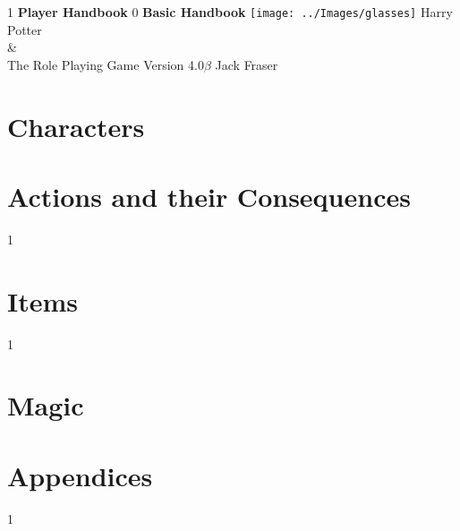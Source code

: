 \documentclass[oneside, twocolumn,9pt,english]{extbook}
\def\coreMode{1}
\newcommand*\cleartoleftpage{%
  \clearpage
  \ifodd\value{page}\hbox{}\clearpage\fi
}
\begin{document}
\begin{titlepage}
    \centering
    \vfill
    \if\coreMode1
    {\bfseries
        {\HP \fontsize{40}{35}\selectfont Player Handbook}
    }    
    \fi
    \if\coreMode0
    {\bfseries
        {\HP \fontsize{40}{35}\selectfont Basic Handbook}
    } 
    \fi
    \vfill
    \texttt{[image: ../Images/glasses]} %
    \vfill
    {\HP \fontsize{30}{24} \selectfont  Harry Potter \\\&\\ The Role Playing Game}
    \normalsize
    \vfill
    {\HP \fontsize{22}{0} \selectfont Version 4.0$\beta$ \hfill Jack Fraser}
\end{titlepage}

\setcounter{tocdepth}{0}  
\begin{spacing}{0.8}
\footnotesize
\tableofcontents
\normalsize
\end{spacing}


\cleartoleftpage
\part{Characters} \label{C:CharacterCreation}


%



\cleartoleftpage
\part{Actions and their Consequences}





\if\coreMode1	
	
\fi
\part{Items}


\if \coreMode1
	
\fi

\cleartoleftpage
\part{Magic}

\cleartoleftpage
\part{Appendices}



\if\coreMode1	
	
\fi
\cleartoleftpage


\end{document}
